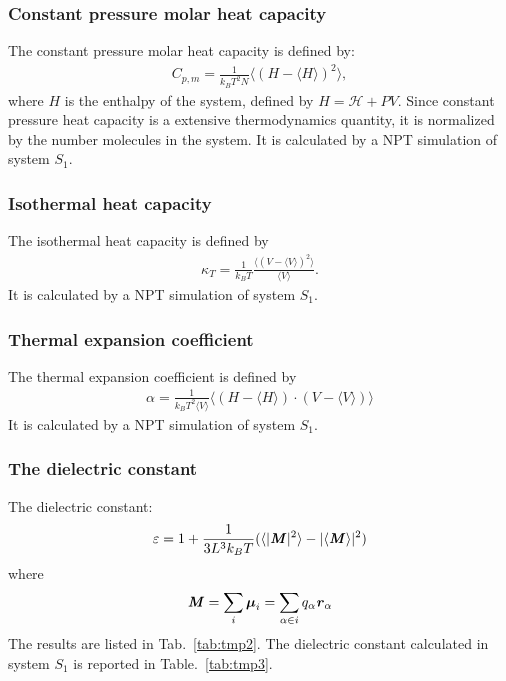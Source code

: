 \documentclass[aip,jcp,a4paper,preprint,unsortedaddress,onecolumn,fleqn]{revtex4-1}
\newcommand{\eps}{\varepsilon}
\newcommand{\vect}[1]{\textbf{\textit{#1}}}
\newcommand{\systemsb}{S_1}
\begin{document}
\subsubsection{Constant pressure molar heat capacity}
The constant pressure molar heat capacity is defined by:
\begin{align}
  C_{p,m} = \frac{1}{k_BT^2 N} \langle ( H - \langle H\rangle)^2 \rangle,
\end{align}
where $ H$ is the enthalpy of the system, defined by $H = \mathcal H + PV$. Since constant
pressure heat capacity is a extensive thermodynamics quantity, it is
normalized by the number molecules in the system.
It is calculated by a NPT simulation of  system $\systemsb$.


\subsubsection{Isothermal heat capacity}
The isothermal heat capacity is defined by
\begin{align}
  \kappa_T = \frac{1}{k_BT} \frac{\langle (V - \langle V\rangle)^2 \rangle}{\langle V\rangle}.
\end{align}
It is calculated by a NPT simulation of  system $\systemsb$.


\subsubsection{Thermal expansion coefficient}
The thermal expansion coefficient is defined by
\begin{align}
  \alpha = \frac{1}{k_BT^2\langle V\rangle} \langle (H - \langle H\rangle)\cdot(V - \langle V\rangle) \rangle
\end{align}
It is calculated by a NPT simulation of  system $\systemsb$.


\subsubsection{The dielectric constant}

The dielectric constant:
\begin{align}
  \eps = 1 + \frac{1}{3L^3 k_BT} ( \langle \vert \vect M\vert^2\rangle - \vert\langle \vect M\rangle\vert^2 )
\end{align}
where
\begin{align}
  \vect M = \sum_i\boldsymbol\mu_i = \sum_{\alpha\in i} q_\alpha\vect r_\alpha
\end{align}
The results are listed in Tab.~\ref{tab:tmp2}. The dielectric constant calculated in system $\systemsb$ is reported in Table.~\ref{tab:tmp3}.
\end{document}
